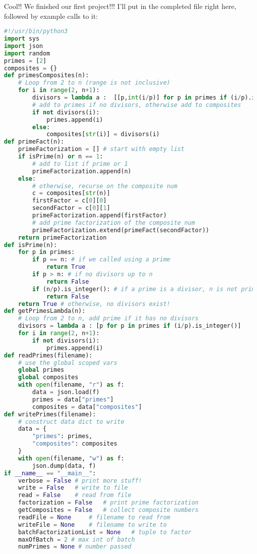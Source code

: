 \documentclass[11pt, twoside, reqno]{book}
\begin{document}
Cool!! We finished our first project!!! I'll put in the completed file right here, followed by example calls to it:
\begin{lstlisting}[language=Python]
#!/usr/bin/python3
import sys
import json
import random
primes = [2]
composites = {}
def primesComposites(n):
    # Loop from 2 to n (range is not inclusive)
    for i in range(2, n+1):
        divisors = lambda a :  [[p,int(i/p)] for p in primes if (i/p).is_integer()]
        # add to primes if no divisors, otherwise add to composites
        if not divisors(i):
            primes.append(i)
        else:
            composites[str(i)] = divisors(i)
def primeFact(n):
    primeFactorization = [] # start with empty list
    if isPrime(n) or n == 1:
        # add to list if prime or 1
        primeFactorization.append(n)
    else:
        # otherwise, recurse on the composite num
        c = composites[str(n)]
        firstFactor = c[0][0]
        secondFactor = c[0][1]
        primeFactorization.append(firstFactor)
        # add prime factorization of the composite num
        primeFactorization.extend(primeFact(secondFactor))
    return primeFactorization
def isPrime(n):
    for p in primes:
        if p == n: # if we called using a prime
            return True
        if p > n: # if no divisors up to n
            return False
        if (n/p).is_integer(): # if a prime is a divisor, n is not prime
            return False
    return True # otherwise, no divisors exist!
def getPrimesLambda(n):
    # Loop from 2 to n, add prime if it has no divisors
    divisors = lambda a : [p for p in primes if (i/p).is_integer()]
    for i in range(2, n+1):
        if not divisors(i):
            primes.append(i)
def readPrimes(filename):
    # use the global scoped vars
    global primes
    global composites
    with open(filename, "r") as f:
        data = json.load(f)
        primes = data["primes"]
        composites = data["composites"]
def writePrimes(filename):
    # construct data dict to write
    data = {
        "primes": primes,
        "composites": composites
    }
    with open(filename, "w") as f:
        json.dump(data, f)
if __name__ == "__main__":
    verbose = False # print more stuff!
    write = False   # write to file
    read = False    # read from file
    factorization = False   # print prime factorization
    getComposites = False   # collect composite numbers
    readFile = None     # filename to read from
    writeFile = None    # filename to write to
    batchFactorizationList = None   # tuple to factor
    maxOfBatch = 2 # max int of batch
    numPrimes = None # number passed

\end{lstlisting}
\end{document}
